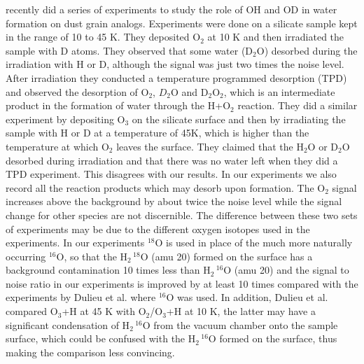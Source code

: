 \documentclass[iop]{emulateapj}
\begin{document}
\citet{Dulieu2013} recently did a series of experiments to study the role of OH and OD in water formation on dust grain analogs. Experiments were done on a silicate sample kept in the range of 10 to 45 K. They deposited O$_2$ at 10 K and then irradiated the sample with  D atoms. They observed that some water (D$_2$O) desorbed during the irradiation with H or D, although the signal was just two times the noise level.  After irradiation they conducted a temperature programmed desorption (TPD) and observed the desorption of O$_2$, $D_2$O and D$_2$O$_2$, which is an intermediate product in the formation of water through the H+O$_2$ reaction. They did a similar experiment by depositing O$_3$ on the silicate surface and then by irradiating the sample with H or D at a temperature of 45K, which is higher than the temperature at which O$_2$ leaves the surface. They claimed that the H$_2$O or D$_2$O desorbed during irradiation and that there was no water left when they did a TPD experiment. This disagrees with our results. In our experiments we also record all the reaction products which may desorb upon formation. The O$_2$ signal increases above the background by about twice the noise level while the signal change for other species are not discernible. The difference between these two sets of experiments may be due to the different oxygen isotopes used in the experiments. In our experiments $^{18}$O is used in place of the much more naturally occurring $^{16}$O, so that the H$_2\,^{18}$O (amu 20) formed on the surface has a background contamination 10 times less than H$_2\,^{16}$O (amu 20) and the signal to noise ratio in our experiments is improved by at least 10 times compared with the experiments by Dulieu et al. where $^{16}$O was used. In addition, Dulieu et al. compared O$_3$+H at 45 K with O$_2$/O$_3$+H at 10 K, the latter may have a significant condensation of H$_2\,^{16}$O from the vacuum chamber onto the sample surface, which could be confused with the H$_2\,^{16}$O formed on the surface, thus making the comparison less convincing. 
\end{document}
